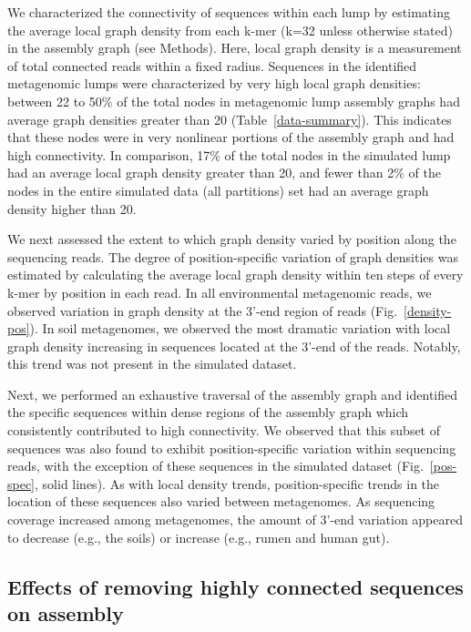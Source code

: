 \documentclass[10pt]{article}
\begin{document}
We characterized the connectivity of sequences
within each lump by estimating the average local graph density from
each k-mer (k=32 unless otherwise stated) in the assembly graph (see
Methods).  Here, local graph density is a measurement of total
connected reads within a fixed radius.  Sequences
in the identified metagenomic lumps were characterized by very high
local graph densities: between 22 to 50\% of the total nodes in
metagenomic lump assembly graphs had average graph densities greater
than 20 (Table~\ref{data-summary}).  This indicates that these nodes were in very nonlinear portions of the assembly graph and had high connectivity.  In comparison, 17\% of the total nodes in the
simulated lump had an average local graph density greater than 20, and
fewer than 2\% of the nodes in the entire simulated data (all partitions) set had an
average graph density higher than 20.

We next assessed the extent to which graph density varied by position
along the sequencing reads.  The degree of position-specific variation of
graph densities was estimated by calculating the average local graph
density within ten steps of every k-mer by position in each read.  In
all environmental metagenomic reads, we observed variation in graph
density at the 3'-end region of reads (Fig.~\ref{density-pos}).  In soil
metagenomes, we observed the most dramatic variation with local graph
density increasing in sequences located at the 3'-end of the reads.
Notably, this trend was not present in the simulated dataset.

Next, we performed an exhaustive traversal of the assembly graph and
identified the specific sequences within dense regions of the assembly
graph which consistently contributed to high connectivity.  We
observed that this subset of sequences was also found to exhibit
position-specific variation within sequencing reads, with the
exception of these sequences in the simulated dataset (Fig.~\ref{pos-spec}, solid
lines).  As with local density trends, position-specific trends in
the location of these sequences also varied between metagenomes.  As
sequencing coverage increased among metagenomes, the amount of 3'-end
variation appeared to decrease (e.g., the soils) or increase (e.g.,
rumen and human gut).

\subsection*{Effects of removing highly connected sequences on assembly}
\end{document}
